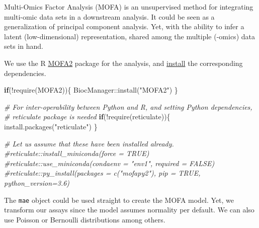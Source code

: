 \documentclass[
]{book}
\newenvironment{Shaded}{\begin{snugshade}}{\end{snugshade}}
\newcommand{\CommentTok}[1]{\textcolor[rgb]{0.56,0.35,0.01}{\textit{#1}}}
\newcommand{\ControlFlowTok}[1]{\textcolor[rgb]{0.13,0.29,0.53}{\textbf{#1}}}
\newcommand{\FunctionTok}[1]{\textcolor[rgb]{0.00,0.00,0.00}{#1}}
\newcommand{\NormalTok}[1]{#1}
\newcommand{\SpecialCharTok}[1]{\textcolor[rgb]{0.00,0.00,0.00}{#1}}
\newcommand{\StringTok}[1]{\textcolor[rgb]{0.31,0.60,0.02}{#1}}
\begin{document}
Multi-Omics Factor Analysis \citep{Argelaguet2018} (MOFA) is an
unsupervised method for integrating multi-omic data sets in a
downstream analysis. It could be seen as a generalization of
principal component analysis. Yet, with the ability to infer a latent
(low-dimensional) representation, shared among the multiple (-omics)
data sets in hand.

We use the R \href{https://biofam.github.io/MOFA2/index.html}{MOFA2}
package for the analysis, and
\href{https://biofam.github.io/MOFA2/installation.html}{install} the
corresponding dependencies.

\begin{Shaded}
\begin{Highlighting}[]
\ControlFlowTok{if}\NormalTok{(}\SpecialCharTok{!}\FunctionTok{require}\NormalTok{(MOFA2))\{}
\NormalTok{    BiocManager}\SpecialCharTok{::}\FunctionTok{install}\NormalTok{(}\StringTok{"MOFA2"}\NormalTok{)}
\NormalTok{\}}

\CommentTok{\# For inter{-}operability between Python and R, and setting Python dependencies,}
\CommentTok{\# reticulate package is needed}
\ControlFlowTok{if}\NormalTok{(}\SpecialCharTok{!}\FunctionTok{require}\NormalTok{(reticulate))\{}
    \FunctionTok{install.packages}\NormalTok{(}\StringTok{"reticulate"}\NormalTok{)}
\NormalTok{\}}

\CommentTok{\# Let us assume that these have been installed already.}
\CommentTok{\#reticulate::install\_miniconda(force = TRUE)}
\CommentTok{\#reticulate::use\_miniconda(condaenv = "env1", required = FALSE)}
\CommentTok{\#reticulate::py\_install(packages = c("mofapy2"), pip = TRUE, python\_version=3.6)}
\end{Highlighting}
\end{Shaded}

The \texttt{mae} object could be used straight to create the MOFA model. Yet,
we transform our assays since the model assumes normality per
default. We can also use Poisson or Bernoulli distributions among others.
\end{document}
